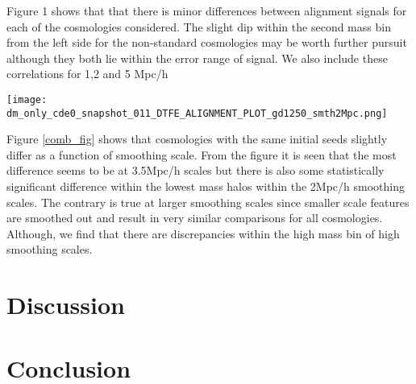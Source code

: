 \documentclass[a4paper,fleqn,usenatbib]{mnras}
\begin{document}
Figure 1 shows that that there is minor differences between alignment signals for each of the cosmologies considered. The slight dip within the second mass bin from the left side for the non-standard cosmologies may be worth further pursuit although they both lie within the error range of \citet{Trowland_13} signal. We also include these correlations for 1,2 and 5 Mpc/h

\begin{figure*}
\centering
\texttt{[image: dm\_only\_cde0\_snapshot\_011\_DTFE\_ALIGNMENT\_PLOT\_gd1250\_smth2Mpc.png]}
\label{comb_fig} 
\caption{This figure shows overplotting of 3 cosmologies as in legend for 3 smoothing scales}
\end{figure*}

Figure \ref{comb_fig} shows that cosmologies with the same initial seeds slightly differ as a function of smoothing scale. From the figure it is seen that the most difference seems to be at 3.5Mpc/h scales but there is also some statistically significant difference within the lowest mass halos within the 2Mpc/h smoothing scales. The contrary is true at larger smoothing scales since smaller scale features are smoothed out and result in very similar comparisons for all cosmologies. Although, we find that there are discrepancies within the high mass bin of high smoothing scales.
\\



\section{Discussion}\label{discussion}



\section{Conclusion}\label{conclusion}


 

\bsp	%
\label{lastpage}
\end{document}
